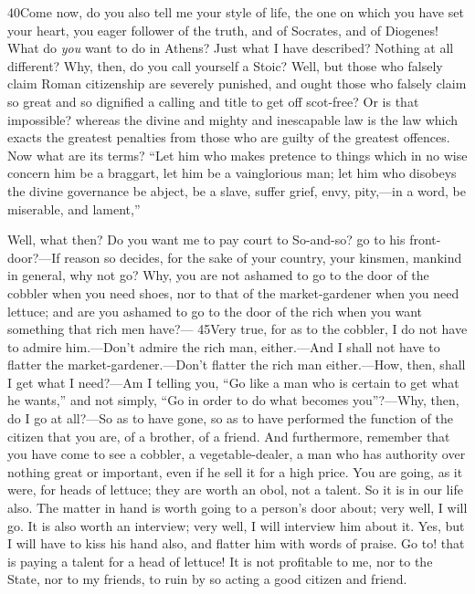 40Come now, do you also tell me your style of life, the one on which you have set your heart, you eager follower of the truth, and of Socrates, and of Diogenes! What do \emph{you} want to do in Athens? Just what I have described? Nothing at all different? Why, then, do you call yourself a Stoic? Well, but those who falsely claim Roman citizenship are severely punished, and ought those who falsely claim so great and so dignified a calling and title to get off scot-free? Or is that impossible? whereas the divine and mighty and inescapable law is the law which exacts the greatest penalties from those who are guilty of the greatest offences. Now what are its terms? ``Let him who makes pretence to things which in no wise concern him be a braggart, let him be a vainglorious man; let him who disobeys the divine governance be abject, be a slave, suffer grief, envy, pity,—in a word, be miserable, and lament,''

Well, what then? Do you want me to pay court to So-and-so? go to his front-door?—If reason so decides, for the sake of your country, your kinsmen, mankind in general, why not go? Why, you are not ashamed to go to the door of the cobbler when you need shoes, nor to that of the market-gardener when you need lettuce; and are you ashamed to go to the door of the rich when you want something that rich men have?— 45Very true, for as to the cobbler, I do not have to admire him.—Don't admire the rich man, either.—And I shall not have to flatter the market-gardener.—Don't flatter the rich man either.—How, then, shall I get what I need?—Am I telling you, ``Go like a man who is certain to get what he wants,'' and not simply, ``Go in order to do what becomes you''?—Why, then, do I go at all?—So as to have gone, so as to have performed the function of the citizen that you are, of a brother, of a friend. And furthermore, remember that you have come to see a cobbler, a vegetable-dealer, a man who has authority over nothing great or important, even if he sell it for a high price. You are going, as it were, for heads of lettuce; they are worth an obol, not a talent. So it is in our life also. The matter in hand is worth going to a person's door about; very well, I will go. It is also worth an interview; very well, I will interview him about it. Yes, but I will have to kiss his hand also, and flatter him with words of praise. Go to! that is paying a talent for a head of lettuce! It is not profitable to me, nor to the State, nor to my friends, to ruin by so acting a good citizen and friend.

